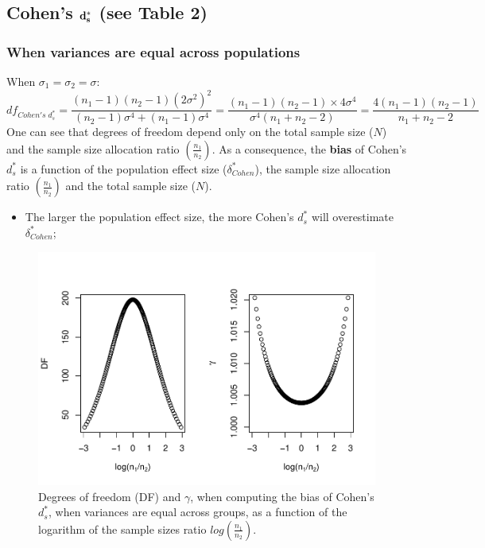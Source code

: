 \documentclass[
  english,
  man]{apa6}
\providecommand{\tightlist}{%
  \setlength{\itemsep}{0pt}\setlength{\parskip}{0pt}}
\begin{document}
\hypertarget{cohens-bf-d_s-see-table-2}{%
\subsection{\texorpdfstring{Cohen's \(\bf d^*_s\) (see Table 2)}{Cohen's \textbackslash bf d\^{}*\_s (see Table 2)}}\label{cohens-bf-d_s-see-table-2}}

\hypertarget{when-variances-are-equal-across-populations}{%
\subsubsection{When variances are equal across populations}\label{when-variances-are-equal-across-populations}}

When \(\sigma_1=\sigma_2=\sigma\):
\[df_{Cohen's \; d^*_s} = \frac{(n_1-1)(n_2-1)(2\sigma^2)^2}{(n_2-1)\sigma^4+(n_1-1)\sigma^4} = \frac{(n_1-1)(n_2-1)\times 4\sigma^4}{\sigma^4(n_1+n_2-2)} = \frac{4(n_1-1)(n_2-1)}{n_1+n_2-2}\]
One can see that degrees of freedom depend only on the total sample size (\(N\)) and the sample size allocation ratio \(\left( \frac{n_1}{n_2}\right)\). As a consequence, the \textbf{bias} of Cohen's \(d^*_s\) is a function of the population effect size (\(\delta^*_{Cohen}\)), the sample size allocation ratio \(\left( \frac{n_1}{n_2}\right)\) and the total sample size (\(N\)).

\begin{itemize}
\tightlist
\item
  The larger the population effect size, the more Cohen's \(d^*_s\) will overestimate \(\delta^*_{Cohen}\);
\end{itemize}

\begin{figure}
\centering
\includegraphics{Theoretical-Bias-of-all-estimators-as-a-function-of-population-parameters_files/figure-latex/biascohendprimehomNratio2-1.pdf}
\caption{\label{fig:biascohendprimehomNratio2}Degrees of freedom (DF) and \(\gamma\), when computing the bias of Cohen's \(d^*_s\), when variances are equal across groups, as a function of the logarithm of the sample sizes ratio \(log\left(\frac{n_1}{n_2} \right)\).}
\end{figure}
\end{document}
